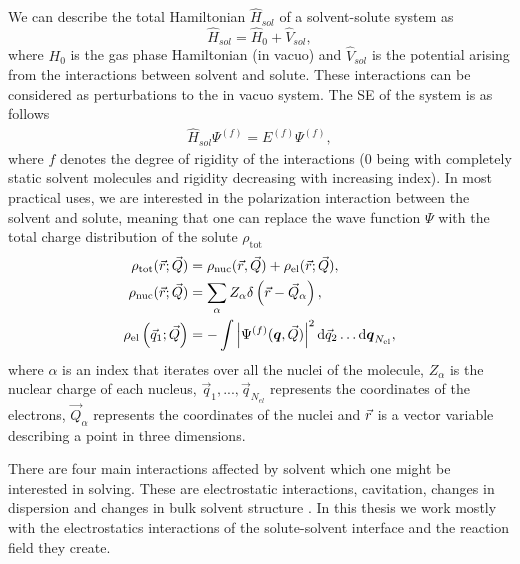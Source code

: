 \documentclass[../master_thesis.tex]{subfiles}
\begin{document}
We can describe the total Hamiltonian $\hat{H}_{sol}$ of a solvent-solute system as
\cite{Tomasi:1994wt}
\begin{equation}\label{eq:Hsolvent}
  \hat{H}_{sol} = \hat{H}_0 + \hat{V}_{sol},
\end{equation}
where $H_0$ is the gas phase Hamiltonian (in vacuo) and $\hat{V}_{sol}$ is the
potential arising from the interactions between solvent and solute. These
interactions can be considered as perturbations to the in vacuo system.
The \ac{SE} of the system is as follows \cite{Tomasi:1994wt}
\begin{align}\label{eq:solSE}
  \hat{H}_{sol}\Psi^{(f)} = E^{(f)}\Psi^{(f)},
\end{align}
where $f$ denotes the degree of  rigidity of the interactions (0 being with
completely static solvent molecules and rigidity decreasing with increasing
index). In most practical uses, we are interested in the polarization interaction
between the solvent and solute, meaning that one can replace the wave function $\Psi$ with the
total charge distribution of the solute $\rho_{\mathrm{tot}}$
\cite{Tomasi:1994wt}
\begin{align}
  \begin{split}\mathbb{}
      \rho_{\mathrm{tot}}(\vec{r} ; \vec{Q}) &=
      \rho_{\mathrm{nuc}}(\vec{r}, \vec{Q})
      + \rho_{\mathrm{el}}(\vec{r} ; \vec{Q}), \\
      \rho_{\mathrm{nuc}}(\vec{r} ; \vec{Q}) &=
      \sum_{\alpha} Z_{\alpha} \delta\left(\vec{r}
      - \vec{Q}_{\alpha}\right), \\
      \rho_{\mathrm{el}}\left(\vec{q}_{1} ; \vec{Q}\right) &=
      -\int\left|\Psi^{(f)}(\boldsymbol{q}, \vec{Q})\right|^{2}
      \mathrm{d}\vec{q}_{2} \ldots \mathrm{d}\boldsymbol{q}_{N_{\mathrm{el}}},
  \end{split}
\end{align}
where $\alpha$ is an index that iterates over all the nuclei of the molecule,
$Z_{\alpha}$ is the nuclear charge of each nucleus, $\vec{q}_1, ..., \vec{q}_{N_{el}}$
represents the coordinates of the electrons, $\vec{Q}_{\alpha}$ represents the
coordinates of the nuclei and $\vec{r}$ is a vector variable describing a point
in three dimensions.

There are four main interactions affected by solvent which one might be
interested in solving. These are electrostatic interactions, cavitation,
changes in dispersion and changes in bulk solvent structure \cite{Cramer:2004}.
In this thesis we work mostly with the electrostatics interactions of the
solute-solvent interface and the reaction field they create.
\end{document}
